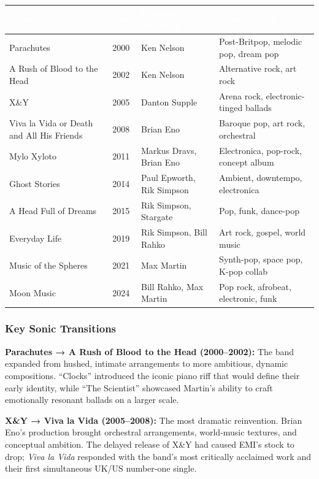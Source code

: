 \documentclass[11pt,letterpaper]{article}
\newcommand{\tableheader}[1]{\textbf{\sffamily\textcolor{white}{#1}}}
\begin{document}
\begin{center}
\begin{tabularx}{\textwidth}{L{3.5cm}C{1cm}L{3cm}X}
\toprule
{}
\tableheader{Album} & \tableheader{Year} & \tableheader{Primary Producer} & \tableheader{Genre / Style} \\
\midrule
Parachutes & 2000 & Ken Nelson & Post-Britpop, melodic pop, dream pop \\
A Rush of Blood to the Head & 2002 & Ken Nelson & Alternative rock, art rock \\
X\&Y & 2005 & Danton Supple & Arena rock, electronic-tinged ballads \\
Viva la Vida or Death and All His Friends & 2008 & Brian Eno & Baroque pop, art rock, orchestral \\
Mylo Xyloto & 2011 & Markus Dravs, Brian Eno & Electronica, pop-rock, concept album \\
Ghost Stories & 2014 & Paul Epworth, Rik Simpson & Ambient, downtempo, electronica \\
A Head Full of Dreams & 2015 & Rik Simpson, Stargate & Pop, funk, dance-pop \\
Everyday Life & 2019 & Rik Simpson, Bill Rahko & Art rock, gospel, world music \\
Music of the Spheres & 2021 & Max Martin & Synth-pop, space pop, K-pop collab \\
Moon Music & 2024 & Bill Rahko, Max Martin & Pop rock, afrobeat, electronic, funk \\
\bottomrule
\end{tabularx}
\end{center}

\subsubsection{Key Sonic Transitions}

\textbf{Parachutes → A Rush of Blood to the Head (2000--2002):} The band expanded from hushed, intimate arrangements to more ambitious, dynamic compositions. ``Clocks'' introduced the iconic piano riff that would define their early identity, while ``The Scientist'' showcased Martin's ability to craft emotionally resonant ballads on a larger scale.

\textbf{X\&Y → Viva la Vida (2005--2008):} The most dramatic reinvention. Brian Eno's production brought orchestral arrangements, world-music textures, and conceptual ambition. The delayed release of X\&Y had caused EMI's stock to drop; \textit{Viva la Vida} responded with the band's most critically acclaimed work and their first simultaneous UK/US number-one single.
\end{document}

